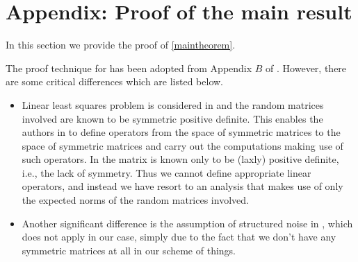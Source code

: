 \onecolumn
\section{Appendix: Proof of the main result}

In this section we provide the proof of \cref{maintheorem}.

The proof technique for  has been adopted from Appendix $B$ of \cite{bachharder} . However, there are some critical differences which are listed below.
\begin{itemize}
\item Linear least squares problem is considered in \cite{bachharder} and the random matrices involved are known to be symmetric positive definite. This enables the authors in \cite{bachharder} to define operators from the space of symmetric matrices to the space of symmetric matrices and carry out the computations making use of such operators. In  the matrix is known only to be (laxly) positive definite, i.e., the lack of symmetry. 
Thus we cannot define appropriate linear operators, and instead we have resort to an analysis that makes use of only the expected norms of the random matrices involved.
\item Another significant difference is the assumption of structured noise in \cite{bachharder}, which does not apply in our case, simply due to the fact that we don't have any symmetric matrices at all in our scheme of things.
\end{itemize}



